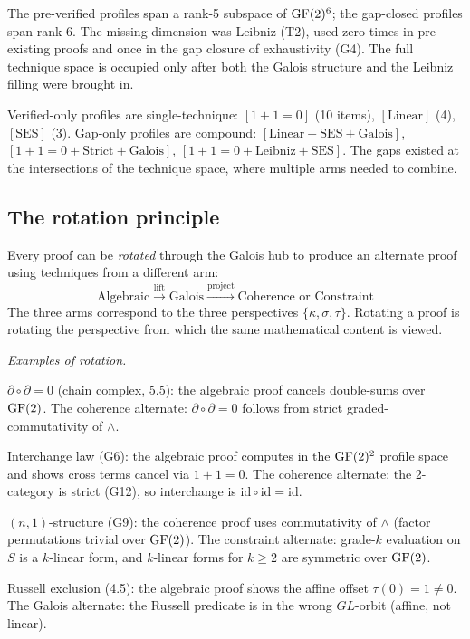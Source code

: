 The pre-verified profiles span a rank-5 subspace of
$\operatorname{GF}(2)^6$; the gap-closed profiles span rank 6. The
missing dimension was Leibniz (T2), used zero times in
pre-existing proofs and once in the gap closure of
exhaustivity (G4). The full technique space is occupied
only after both the Galois structure and the Leibniz
filling were brought in.

Verified-only profiles are single-technique: $[1{+}1{=}0]$
(10 items), $[\text{Linear}]$ (4), $[\text{SES}]$ (3).
Gap-only profiles are compound:
$[\text{Linear}{+}\text{SES}{+}\text{Galois}]$,
$[1{+}1{=}0{+}\text{Strict}{+}\text{Galois}]$,
$[1{+}1{=}0{+}\text{Leibniz}{+}\text{SES}]$.
The gaps existed at the intersections of the technique
space, where multiple arms needed to combine.

\subsection{The rotation principle}
\label{sec:rotation}

Every proof can be \emph{rotated} through the Galois
hub to produce an alternate proof using techniques from
a different arm:
\[
  \text{Algebraic} \xrightarrow{\text{lift}}
  \text{Galois} \xrightarrow{\text{project}}
  \text{Coherence or Constraint}
\]
The three arms correspond to the three perspectives
$\{\kappa, \sigma, \tau\}$. Rotating a proof is rotating
the perspective from which the same mathematical content
is viewed.

\emph{Examples of rotation.}

$\partial \circ \partial = 0$ (chain complex, 5.5):
the algebraic proof cancels double-sums over $\operatorname{GF}(2)$.
The coherence alternate: $\partial \circ \partial = 0$
follows from strict graded-commutativity of $\wedge$.

Interchange law (G6): the algebraic proof computes in
the $\operatorname{GF}(2)^2$ profile space and shows cross terms
cancel via $1{+}1{=}0$. The coherence alternate: the
2-category is strict (G12), so interchange is
$\mathrm{id} \circ \mathrm{id} = \mathrm{id}$.

$(n,1)$-structure (G9): the coherence proof uses
commutativity of $\wedge$ (factor permutations trivial
over $\operatorname{GF}(2)$). The constraint alternate: grade-$k$
evaluation on $S$ is a $k$-linear form, and $k$-linear
forms for $k \geq 2$ are symmetric over $\operatorname{GF}(2)$.

Russell exclusion (4.5): the algebraic proof shows the
affine offset $\tau(0) = 1 \neq 0$. The Galois
alternate: the Russell predicate is in the wrong
$GL$-orbit (affine, not linear).

